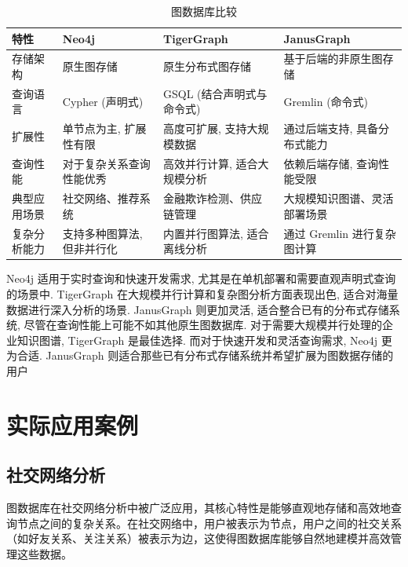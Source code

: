 \documentclass[12pt,hyperref,a4paper,UTF8]{ctexart}
\begin{document}
\begin{table}[htbp]
	\centering
	\caption{图数据库比较}
	\begin{tabularx}{\textwidth}{|X|X|X|X|}
		\hline
		\textbf{特性} & \textbf{Neo4j} & \textbf{TigerGraph} & \textbf{JanusGraph} \\
		\hline
		存储架构        & 原生图存储          & 原生分布式图存储            & 基于后端的非原生图存储         \\
		\hline
		查询语言        & Cypher (声明式)   & GSQL (结合声明式与命令式)    & Gremlin (命令式)       \\
		\hline
		扩展性         & 单节点为主, 扩展性有限   & 高度可扩展, 支持大规模数据      & 通过后端支持, 具备分布式能力     \\
		\hline
		查询性能        & 对于复杂关系查询性能优秀   & 高效并行计算, 适合大规模分析     & 依赖后端存储, 查询性能受限      \\
		\hline
		典型应用场景      & 社交网络、推荐系统      & 金融欺诈检测、供应链管理        & 大规模知识图谱、灵活部署场景      \\
		\hline
		复杂分析能力      & 支持多种图算法, 但非并行化 & 内置并行图算法, 适合离线分析     & 通过 Gremlin 进行复杂图计算  \\
		\hline
	\end{tabularx}
	\label{tab:graph_comparison}
\end{table}

Neo4j 适用于实时查询和快速开发需求, 尤其是在单机部署和需要直观声明式查询的场景中.
TigerGraph 在大规模并行计算和复杂图分析方面表现出色, 适合对海量数据进行深入分析的场景.
JanusGraph 则更加灵活, 适合整合已有的分布式存储系统, 尽管在查询性能上可能不如其他原生图数据库.
对于需要大规模并行处理的企业知识图谱, TigerGraph 是最佳选择. 而对于快速开发和灵活查询需求, Neo4j 更为合适. JanusGraph 则适合那些已有分布式存储系统并希望扩展为图数据存储的用户

\section{实际应用案例}

\subsection{社交网络分析}
图数据库在社交网络分析中被广泛应用，其核心特性是能够直观地存储和高效地查询节点之间的复杂关系。在社交网络中，用户被表示为节点，用户之间的社交关系（如好友关系、关注关系）被表示为边，这使得图数据库能够自然地建模并高效管理这些数据。
\end{document}
